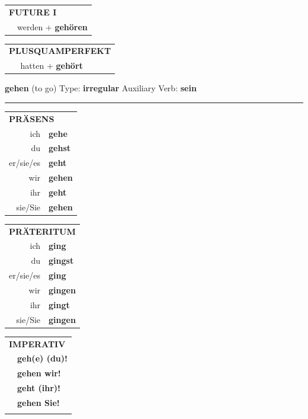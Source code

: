 \documentclass[10pt,a4paper]{revtex4-2}
\begin{document}
\begin{verbbox-dat}
\begin{tabular}{rl}
    \multicolumn{2}{l}{\textbf{FUTURE I} }\\
   & werden + \textbf{gehören}\\
 
  \end{tabular}
\hfill
   \begin{tabular}{rl}
      \multicolumn{2}{l}{\textbf{PLUSQUAMPERFEKT}}\\
   & hatten + \textbf{gehört}\\
  \end{tabular}
  
  \vspace{-5pt}


\end{verbbox-dat}
\begin{verbbox-acc}
    {\Large \bf gehen} (to go) \hfill Type: \textbf{irregular} \hfill Auxiliary Verb: \textbf{sein} 
    
     \vspace{5pt}

    \hrule
    
    \vspace{5pt}

  \begin{tabular}{rl}
     \multicolumn{2}{l}{\textbf{PRÄSENS} }\\
    ich & \textbf{gehe}\\
    du & \textbf{gehst}\\
    er/sie/es & \textbf{geht}\\
    wir & \textbf{gehen}\\
    ihr & \textbf{geht}\\
    sie/Sie & \textbf{gehen}\\
  \end{tabular}
  \hfill
     \begin{tabular}{rl}
    \multicolumn{2}{l}{\textbf{PRÄTERITUM} }\\
    ich & \textbf{ging}\\
    du & \textbf{gingst}\\
    er/sie/es & \textbf{ging}\\
    wir & \textbf{gingen}\\
    ihr & \textbf{gingt}\\
    sie/Sie & \textbf{gingen}\\
  \end{tabular}
  \hfill
  \begin{tabular}{rl}
     \multicolumn{2}{l}{\textbf{IMPERATIV} }\\
   & \textbf{geh(e) (du)!}\\
   & \textbf{gehen wir!}\\
   & \textbf{geht (ihr)!}\\
   & \textbf{gehen Sie!}\\
   & \vspace{10pt}
  \end{tabular}


\end{verbbox-acc}
\end{document}
